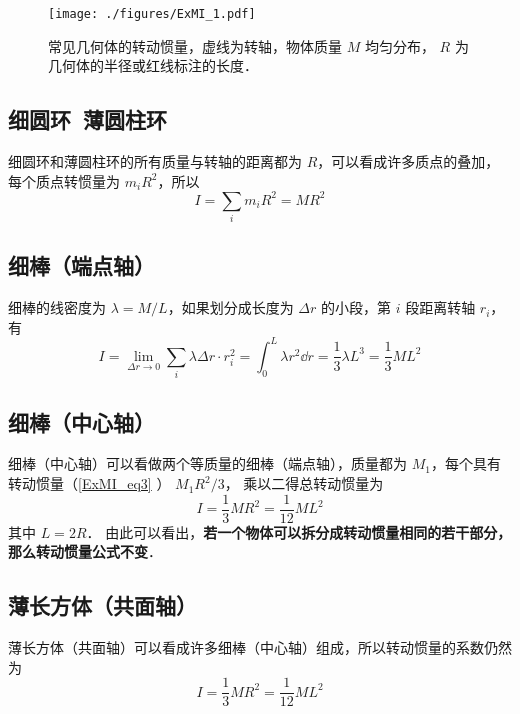 

\begin{figure}[ht]
\centering
\texttt{[image: ./figures/ExMI\_1.pdf]}
\caption{常见几何体的转动惯量，虚线为转轴，物体质量 $M$ 均匀分布， $R$ 为几何体的半径或红线标注的长度．}\label{ExMI_fig1}
\end{figure}

\subsection{细圆环\ 薄圆柱环}
细圆环和薄圆柱环的所有质量与转轴的距离都为 $R$，可以看成许多质点的叠加，每个质点转惯量为 $m_i R^2$，所以
\begin{equation}\label{ExMI_eq4}
I = \sum_i m_i R^2 = M R^2
\end{equation}

\subsection{ 细棒（端点轴）}
细棒的线密度为 $\lambda  = M/L$，如果划分成长度为 $\Delta r$ 的小段，第 $i$ 段距离转轴 $r_i$， 有
\begin{equation}\label{ExMI_eq3}
I = \lim_{\Delta r \to 0}\sum_i \lambda\Delta r \cdot r_i^2 =  \int_0^L \lambda r^2 \dd{r} = \frac{1}{3}\lambda L^3 = \frac{1}{3}M L^2
\end{equation}

\subsection{细棒（中心轴）}
细棒（中心轴）可以看做两个等质量的细棒（端点轴），质量都为 $M_1$，每个具有转动惯量（\autoref{ExMI_eq3} ） $M_1 R^2/3$， 乘以二得总转动惯量为
\begin{equation}\label{ExMI_eq2}
I = \frac{1}{3} MR^2 = \frac{1}{12}ML^2
\end{equation}
其中 $L=2R$． 由此可以看出，\textbf{若一个物体可以拆分成转动惯量相同的若干部分，那么转动惯量公式不变}．

\subsection{薄长方体（共面轴）}
\label{ExMI_eq5}\label{ExMI_eq6}\label{ExMI_eq7}\label{ExMI_eq8}薄长方体（共面轴）可以看成许多细棒（中心轴）组成，所以转动惯量的系数仍然为
\begin{equation}\label{ExMI_eq8} 
I = \frac{1}{3} MR^2 = \frac{1}{12}ML^2
\end{equation}

